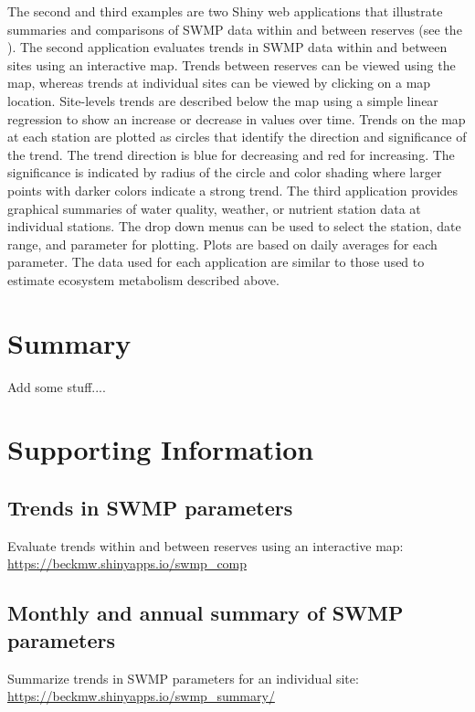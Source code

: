 \documentclass[10pt,letterpaper]{article}\usepackage[]{graphicx}\usepackage[]{color}
\begin{document}
The second and third examples are two Shiny web applications \cite{Chang15} that illustrate summaries and comparisons of \ac{SWMP} data within and between reserves (see the ).  The second application evaluates trends in \ac{SWMP} data within and between sites using an interactive map.  Trends between reserves can be viewed using the map, whereas trends at individual sites can be viewed by clicking on a map location.  Site-levels trends are described below the map using a simple linear regression to show an increase or decrease in values over time.  Trends on the map at each station are plotted as circles that identify the direction and significance of the trend.  The trend direction is blue for decreasing and red for increasing.  The significance is indicated by radius of the circle and color shading where larger points with darker colors indicate a strong trend.  The third application provides graphical summaries of water quality, weather, or nutrient station data at individual stations. The drop down menus can be used to select the station, date range, and parameter for plotting. Plots are based on daily averages for each parameter.  The data used for each application are similar to those used to estimate ecosystem metabolism described above.  


\section*{Summary}

Add some stuff....

\section*{Supporting Information}
\label{supp_info}

\subsection*{Trends in \ac{SWMP} parameters}
\label{swmp_trends}
Evaluate trends within and between reserves using an interactive map: \href{https://beckmw.shinyapps.io/swmp_comp}{https://beckmw.shinyapps.io/swmp\_comp}

\subsection*{Monthly and annual summary of \ac{SWMP} parameters}
\label{swmp_summary}
Summarize trends in \ac{SWMP} parameters for an individual site: \href{https://beckmw.shinyapps.io/swmp_summary/}{https://beckmw.shinyapps.io/swmp\_summary/} 
\end{document}
